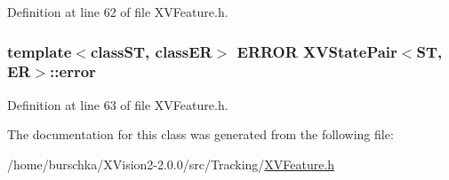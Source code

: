 Definition at line 62 of file XVFeature.h.\label{XVStatePair_m1}
\hypertarget{class_XVStatePair_m1}{
\subsubsection[error]{\setlength{\rightskip}{0pt plus 5cm}template$<$classST, classER$>$ ERROR XVState\-Pair$<$ST, ER$>$::error}}




Definition at line 63 of file XVFeature.h.

The documentation for this class was generated from the following file:\begin{CompactItemize}
\item 
/home/burschka/XVision2-2.0.0/src/Tracking/\hyperlink{XVFeature.h-source}{XVFeature.h}\end{CompactItemize}

